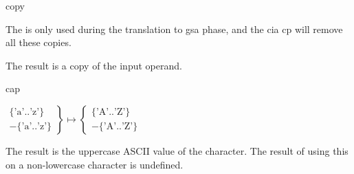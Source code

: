 \begin{instruction}{copy}

  \begin{notes}
    The  is only used during the translation to \ac{gsa}
    phase, and the \ac{cia} \ac{cp} will remove all these copies.
  \end{notes}

  \begin{results}
  \item The result is a copy of the input operand.
  \end{results}

  \begin{operands}
  \item {}
  \end{operands}
\end{instruction}

\begin{instruction}{cap}

  \begin{results}
  \item
    $
    \left.
      \begin{array}{r}
        \{\textrm{'a'..'z'}\} \\
        -\{\textrm{'a'..'z'}\}
      \end{array}
    \right\}
    \mapsto
    \left\{
      \begin{array}{r}
        \{\textrm{'A'..'Z'}\} \\
        -\{\textrm{'A'..'Z'}\}
      \end{array}
    \right.
    $

    The result is the uppercase ASCII value of the character.  The
    result of using this on a non-lowercase character is undefined.
  \end{results}

  \begin{operands}
  \item {}
  \end{operands}
\end{instruction}


